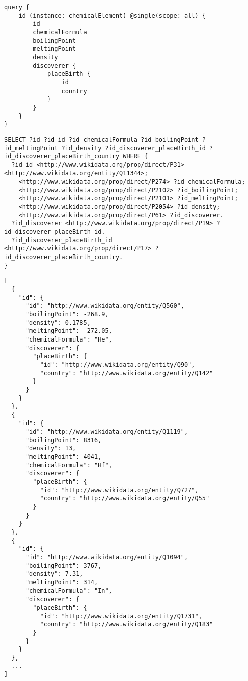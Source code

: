 \begin{minipage}{\linewidth}
\begin{lstlisting}[label=listing:listing23, caption={Query}]
query {
    id (instance: chemicalElement) @single(scope: all) {
        id
        chemicalFormula
        boilingPoint
        meltingPoint
        density
        discoverer {
            placeBirth {
                id
                country
            }
        }
    }
}
\end{lstlisting}
\end{minipage}

\begin{minipage}{\linewidth}
\begin{lstlisting}[label=listing:listing24, caption={Generated SPARQL Query}]
SELECT ?id ?id_id ?id_chemicalFormula ?id_boilingPoint ?id_meltingPoint ?id_density ?id_discoverer_placeBirth_id ?id_discoverer_placeBirth_country WHERE {
  ?id_id <http://www.wikidata.org/prop/direct/P31> <http://www.wikidata.org/entity/Q11344>;
    <http://www.wikidata.org/prop/direct/P274> ?id_chemicalFormula;
    <http://www.wikidata.org/prop/direct/P2102> ?id_boilingPoint;
    <http://www.wikidata.org/prop/direct/P2101> ?id_meltingPoint;
    <http://www.wikidata.org/prop/direct/P2054> ?id_density;
    <http://www.wikidata.org/prop/direct/P61> ?id_discoverer.
  ?id_discoverer <http://www.wikidata.org/prop/direct/P19> ?id_discoverer_placeBirth_id.
  ?id_discoverer_placeBirth_id <http://www.wikidata.org/prop/direct/P17> ?id_discoverer_placeBirth_country.
}
\end{lstlisting}
\end{minipage}

\begin{minipage}{\linewidth}
\begin{lstlisting}[label=listing:listing25, caption={Output}]
[
  {
    "id": {
      "id": "http://www.wikidata.org/entity/Q560",        
      "boilingPoint": -268.9,
      "density": 0.1785,
      "meltingPoint": -272.05,
      "chemicalFormula": "He",
      "discoverer": {
        "placeBirth": {
          "id": "http://www.wikidata.org/entity/Q90",     
          "country": "http://www.wikidata.org/entity/Q142"
        }
      }
    }
  },
  {
    "id": {
      "id": "http://www.wikidata.org/entity/Q1119",
      "boilingPoint": 8316,
      "density": 13,
      "meltingPoint": 4041,
      "chemicalFormula": "Hf",
      "discoverer": {
        "placeBirth": {
          "id": "http://www.wikidata.org/entity/Q727",
          "country": "http://www.wikidata.org/entity/Q55"
        }
      }
    }
  },
  {
    "id": {
      "id": "http://www.wikidata.org/entity/Q1094",
      "boilingPoint": 3767,
      "density": 7.31,
      "meltingPoint": 314,
      "chemicalFormula": "In",
      "discoverer": {
        "placeBirth": {
          "id": "http://www.wikidata.org/entity/Q1731",
          "country": "http://www.wikidata.org/entity/Q183"
        }
      }
    }
  },
  ...
]
\end{lstlisting}
\end{minipage}

